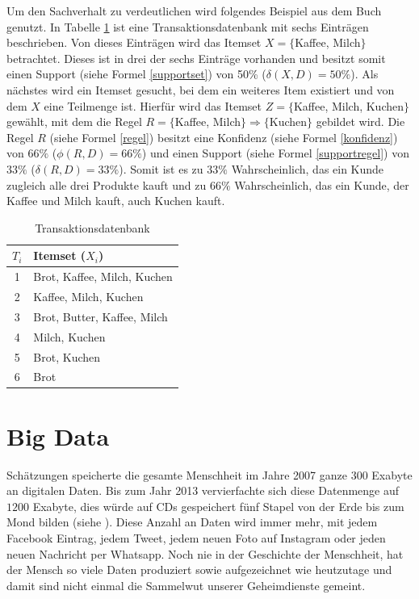 \documentclass[12pt,journal,compsoc]{IEEEtran}
\begin{document}
Um den Sachverhalt zu verdeutlichen wird folgendes Beispiel aus dem Buch \cite{ester2000knowledge} genutzt. In Tabelle \ref{dataass} ist eine Transaktionsdatenbank
mit sechs Einträgen beschrieben. Von dieses Einträgen wird das Itemset $X = \{$Kaffee, Milch$\}$ betrachtet. Dieses ist in drei 
der sechs Einträge vorhanden und besitzt somit einen Support (siehe Formel \ref{supportset}) von 50\% ($\delta(X, D) = 50\%$). Als nächstes wird ein Itemset
gesucht, bei dem ein weiteres Item existiert und von dem $X$ eine Teilmenge ist. Hierfür wird das Itemset $Z = \{$Kaffee, Milch, Kuchen$\}$ gewählt, mit dem die Regel 
$R = \{$Kaffee, Milch$\}\Rightarrow\{$Kuchen$\}$ gebildet wird. Die Regel $R$ (siehe Formel \ref{regel}) besitzt eine Konfidenz (siehe Formel \ref{konfidenz}) von $66\%$ ($\phi(R, D) = 66\%$) und einen Support (siehe Formel \ref{supportregel}) von $33\%$
($\delta(R, D) = 33\%$). 
Somit ist es zu $33\%$ Wahrscheinlich, das ein Kunde zugleich alle drei Produkte kauft und zu $66\%$ Wahrscheinlich, das ein Kunde, der Kaffee und Milch kauft, auch Kuchen kauft.

\begin{table}[!t]
\caption{Transaktionsdatenbank}
\centering
\begin{tabular}{c|l}
    	    $T_i$ & Itemset ($X_i$)\\ \hline
    	    1 & Brot, Kaffee, Milch, Kuchen\\
    	    2 & Kaffee, Milch, Kuchen\\
    	    3 & Brot, Butter, Kaffee, Milch\\
    	    4 & Milch, Kuchen\\
    	    5 & Brot, Kuchen\\
    	    6 & Brot
    	    \end{tabular}
\label{dataass}
\end{table}
  
 \section{Big Data}
  Schätzungen speicherte die gesamte Menschheit im Jahre 2007 ganze $300$
 Exabyte an digitalen Daten. Bis zum Jahr 2013 vervierfachte sich diese Datenmenge auf $1200$ Exabyte, 
dies würde auf CDs gespeichert fünf Stapel von der Erde bis zum Mond bilden (siehe \cite{mayer2014big}). 
Diese Anzahl an Daten wird immer mehr, mit jedem Facebook Eintrag, jedem Tweet, jedem neuen Foto auf 
Instagram oder jeden neuen Nachricht per Whatsapp. Noch nie in der Geschichte der Menschheit, hat der 
Mensch so viele Daten produziert sowie aufgezeichnet wie heutzutage und damit sind nicht einmal die Sammelwut 
unserer Geheimdienste gemeint. 
 
\end{document}
